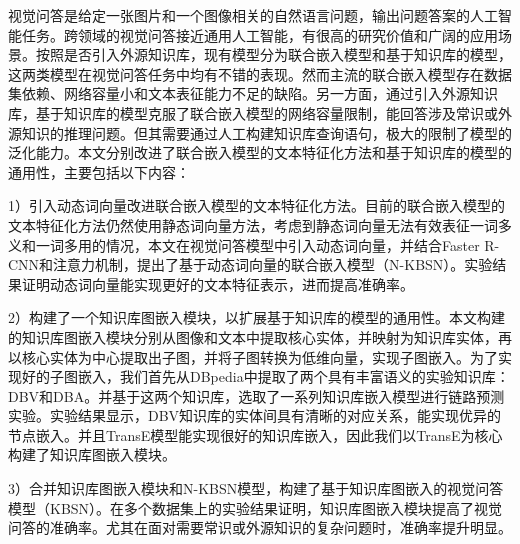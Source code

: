 	
\begin{chineseabstract}
视觉问答是给定一张图片和一个图像相关的自然语言问题，输出问题答案的人工智能任务。跨领域的视觉问答接近通用人工智能，有很高的研究价值和广阔的应用场景。按照是否引入外源知识库，现有模型分为联合嵌入模型和基于知识库的模型，这两类模型在视觉问答任务中均有不错的表现。然而主流的联合嵌入模型存在数据集依赖、网络容量小和文本表征能力不足的缺陷。另一方面，通过引入外源知识库，基于知识库的模型克服了联合嵌入模型的网络容量限制，能回答涉及常识或外源知识的推理问题。但其需要通过人工构建知识库查询语句，极大的限制了模型的泛化能力。本文分别改进了联合嵌入模型的文本特征化方法和基于知识库的模型的通用性，主要包括以下内容：

1）引入动态词向量改进联合嵌入模型的文本特征化方法。目前的联合嵌入模型的文本特征化方法仍然使用静态词向量方法，考虑到静态词向量无法有效表征一词多义和一词多用的情况，本文在视觉问答模型中引入动态词向量，并结合Faster R-CNN和注意力机制，提出了基于动态词向量的联合嵌入模型（N-KBSN）。实验结果证明动态词向量能实现更好的文本特征表示，进而提高准确率。

2）构建了一个知识库图嵌入模块，以扩展基于知识库的模型的通用性。本文构建的知识库图嵌入模块分别从图像和文本中提取核心实体，并映射为知识库实体，再以核心实体为中心提取出子图，并将子图转换为低维向量，实现子图嵌入。为了实现好的子图嵌入，我们首先从DBpedia中提取了两个具有丰富语义的实验知识库：DBV和DBA。并基于这两个知识库，选取了一系列知识库嵌入模型进行链路预测实验。实验结果显示，DBV知识库的实体间具有清晰的对应关系，能实现优异的节点嵌入。并且TransE模型能实现很好的知识库嵌入，因此我们以TransE为核心构建了知识库图嵌入模块。

3）合并知识库图嵌入模块和N-KBSN模型，构建了基于知识库图嵌入的视觉问答模型（KBSN）。在多个数据集上的实验结果证明，知识库图嵌入模块提高了视觉问答的准确率。尤其在面对需要常识或外源知识的复杂问题时，准确率提升明显。

\end{chineseabstract}

